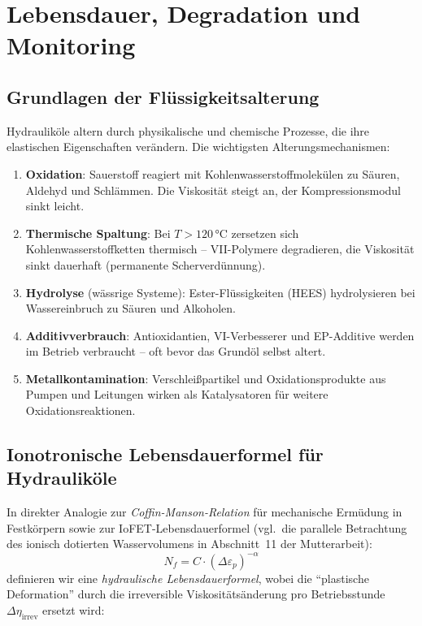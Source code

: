 ﻿\documentclass[a4paper,12pt]{scrreprt}
\theoremstyle{definition}
\begin{document}
\section{Lebensdauer, Degradation und Monitoring}

\subsection{Grundlagen der Flüssigkeitsalterung}

Hydrauliköle altern durch physikalische und chemische Prozesse, die
ihre elastischen Eigenschaften verändern. Die wichtigsten Alterungsmechanismen:

\begin{enumerate}
  \item \textbf{Oxidation}: Sauerstoff reagiert mit Kohlenwasserstoffmolekülen
    zu Säuren, Aldehyd und Schlämmen. Die Viskosität steigt an,
    der Kompressionsmodul sinkt leicht.
  \item \textbf{Thermische Spaltung}: Bei $T > 120\, °\mathrm{C}$ zersetzen
    sich Kohlenwasserstoffketten thermisch -- VII-Polymere degradieren,
    die Viskosität sinkt dauerhaft (permanente Scherverdünnung).
  \item \textbf{Hydrolyse} (wässrige Systeme): Ester-Flüssigkeiten
    (HEES) hydrolysieren bei Wassereinbruch zu Säuren und Alkoholen.
  \item \textbf{Additivverbrauch}: Antioxidantien, VI-Verbesserer und
    EP-Additive werden im Betrieb verbraucht -- oft bevor das Grundöl
    selbst altert.
  \item \textbf{Metallkontamination}: Verschleißpartikel und
    Oxidationsprodukte aus Pumpen und Leitungen wirken als Katalysatoren
    für weitere Oxidationsreaktionen.
\end{enumerate}

\subsection{Ionotronische Lebensdauerformel für Hydrauliköle}

In direkter Analogie zur \emph{Coffin-Manson-Relation} für mechanische
Ermüdung in Festkörpern sowie zur IoFET-Lebensdauerformel (vgl.\ die
parallele Betrachtung des ionisch dotierten Wasservolumens in
Abschnitt~11 der Mutterarbeit):
\begin{equation}
  N_f = C \cdot (\Delta\varepsilon_p)^{-\alpha}
  \label{eq:coffin_manson}
\end{equation}
definieren wir eine \emph{hydraulische Lebensdauerformel}, wobei die
``plastische Deformation'' durch die irreversible Viskositätsänderung
pro Betriebsstunde $\Delta\eta_{\mathrm{irrev}}$ ersetzt wird:
\end{document}
